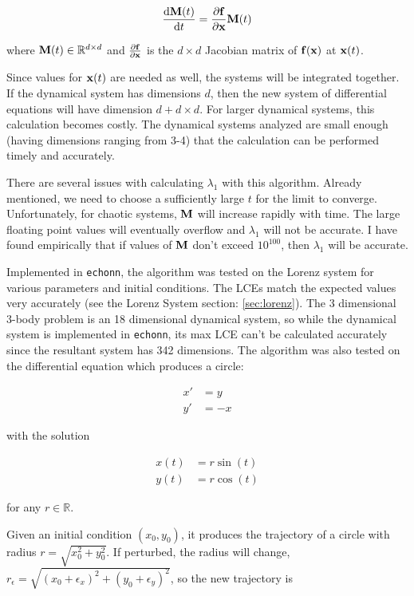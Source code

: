 \documentclass{article}
\newcommand{\echonn}{\texttt{echonn}}
\newcommand{\der}[2][t]{\frac{\mathrm{d}#2}{\mathrm{d}#1}}
\begin{document}
\begin{equation}
    \der{\Mv(t)} = \frac{\partial \fv}{\partial \xv} \Mv(t)
    \label{eq:lce_mat_diffeq}
\end{equation}

where $\mathbf{M}(t) \in \mathbb{R}^{d \times d}$ and $\frac{\partial \mathbf{f}}{\partial
\mathbf{x}}$ is the $d \times d$ Jacobian matrix of $\mathbf{f}(\mathbf{x})$ at $\mathbf{x}(t)$.

Since values for $\mathbf{x}(t)$ are needed as well, the systems will be integrated
together. If the dynamical system has dimensions $d$, then the new system of
differential equations will have dimension $d + d \times d$. For larger
dynamical systems, this calculation becomes costly. The dynamical systems
analyzed are small enough (having dimensions ranging from 3-4) that the
calculation can be performed timely and accurately.

There are several issues with calculating $\lambda_1$ with this algorithm.
Already mentioned, we need to choose a sufficiently large $t$ for the limit
to converge. Unfortunately, for chaotic systems, $\mathbf{M}$ will increase rapidly
with time. The large floating point values will eventually overflow and
$\lambda_1$ will not be accurate. I have found empirically that if values of
$\mathbf{M}$ don't exceed $10^{100}$, then $\lambda_1$ will be accurate.

Implemented in \echonn, the algorithm was tested on the Lorenz system for
various parameters and initial conditions. The LCEs match the expected values
very accurately (see the Lorenz System section: \ref{sec:lorenz}). The 3
dimensional 3-body problem is an 18 dimensional dynamical system, so while
the dynamical system is implemented in \echonn, its max LCE can't be
calculated accurately since the resultant system has 342 dimensions. The
algorithm was also tested on the differential equation which produces a
circle:

\begin{align*}
    x' &= y \\
    y' &= -x
\end{align*}

with the solution 

\begin{align*}
    x(t) &= r\sin(t) \\
    y(t) &= r\cos(t)
\end{align*}

for any $r \in \mathbb{R}$.

Given an initial condition $(x_0, y_0)$, it produces the trajectory of a
circle with radius $r=\sqrt{x_0^2 + y_0^2}$. If perturbed, the radius will
change, $r_\epsilon=\sqrt{(x_0+\epsilon_x)^2 + (y_0+\epsilon_y)^2}$, so the
new trajectory is
\end{document}
